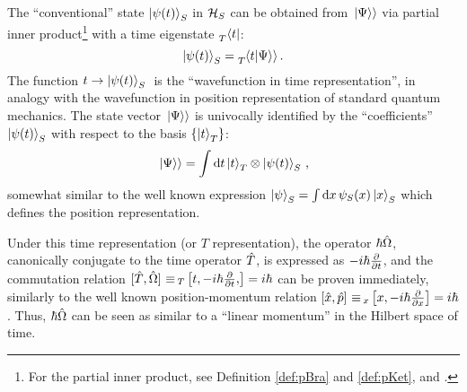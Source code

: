 
The ``conventional'' state $\ket{\psi(t)}_S$ in $\mathcal{H}_S$
can be obtained from $\left.\left| \Psi \right\rangle\right\rangle$ via partial inner product\footnote{
  For the partial inner product,
  see Definition \ref{def:pBra} and \ref{def:pKet},
  and \cite[.3]{QMT_Jacobs}.
}
with a time eigenstate $\prescript{}{T}{\bra{t}}$:
\begin{equation*}
  \ket{\psi(t)}_S = \prescript{}{T}{\!\left.\left\langle t \middle| \Psi \right\rangle\right\rangle} \, \text{.}
\end{equation*}
The function $ t \rightarrow \ket{\psi(t)}_S \; $ is the
``wavefunction in time representation'', in analogy
with the wavefunction in position representation of standard quantum mechanics.
The state vector $\left.\left| \Psi \right\rangle\right\rangle$ is univocally identified by the ``coefficients'' $\ket{\psi(t)}_S$
with respect to the basis $\left\{\ket{t}_T\right\}$:
\begin{equation}\label{eq:pw:}
  \left.\left| \Psi \right\rangle\right\rangle = \int \dd{t} \ket{t}_T \otimes \ket{\psi(t)}_S \, \text{,}
\end{equation}
somewhat similar to the well known expression $\ket{\psi}_S = \int \dd{x} \psi_{S}(x) \ket{x}_S$
which defines the position representation.


Under this time representation (or $T$ representation), the operator $\hbar\hat{\Omega}$,
canonically conjugate to the time operator $\hat{T}$, is expressed as $-i\hbar\pdv{t}$,
and the commutation relation
$[\op{T}, \op{\Omega}] \repr_{T} \comm{t, -i\hbar\pdv{t}}{} = i\hbar$
can be proven
immediately, similarly to the well known position-momentum relation
$\comm{\op{x}}{\op{p}} \repr_{x} \comm{x}{-i\hbar\pdv{x}} = i\hbar$.
Thus, $\hbar\hat{\Omega}$ can be seen as similar to a ``linear momentum''
in the Hilbert space of time.

